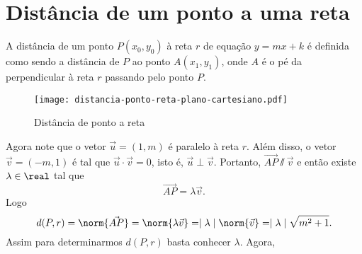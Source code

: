 \section{Dist\^ancia de um ponto a uma reta} %
\label{sec:distancia_de_um_ponto_a_uma_reta}
A dist\^ancia de um ponto $P(x_0,y_0)$ \`a reta $r$ de equa\c{c}\~ao $y = mx + k$ \'e definida como sendo a dist\^ancia de $P$ ao ponto $A(x_1, y_1)$, onde $A$ \'e o p\'e da perpendicular \`a reta $r$ passando pelo ponto $P$.
\begin{figure}[!h]
  \centering
  \caption{Dist\^ancia de ponto a reta}
  \texttt{[image: distancia-ponto-reta-plano-cartesiano.pdf]}


\end{figure}
Agora note que o vetor $\vec{u} = (1,m)$ \'e paralelo \`a reta $r$. Al\'em disso, o vetor $\vec{v} = (-m, 1)$ \'e tal que $\vec{u}\cdot\vec{v} = 0$, isto \'e, $\vec{u}\perp\vec{v}$. Portanto, $\vec{AP}\varparallel\vec{v}$ e ent\~ao existe $\lambda \in \real$ tal que
\[
  \vec{AP} = \lambda\vec{v}.
\]
Logo
\begin{equation}\label{distancia_ponto_reta_plano}
  d(P,r) = \norm{\vec{AP}} = \norm{\lambda\vec{v}} = \mid\lambda\mid \norm{\vec{v}} = \mid\lambda\mid\sqrt{m^2 + 1}.
\end{equation}
Assim para determinarmos $d(P,r)$ basta conhecer $\lambda$. Agora,
